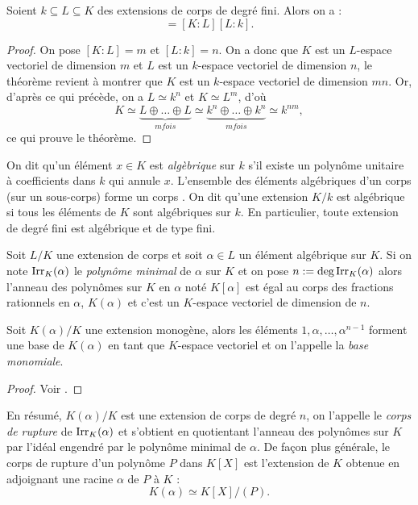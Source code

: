\documentclass[a4paper]{article} %
\numberwithin{section}{part}
\numberwithin{equation}{section}
\newcommand\Irr[2]{\textup{Irr}_{#1}(#2)}
\begin{document}
\begin{thm}
Soient $k \subseteq L \subseteq K$ des extensions de corps de degré fini. Alors 
on a :
\begin{equation}
[K:k] = [K:L][L:k].
\end{equation}
\end{thm}
\begin{proof}
On pose $[K:L] = m$ et $[L:k] = n$. On a donc que $K$ est un $L$-espace 
vectoriel de dimension $m$ et $L$ est un $k$-espace vectoriel de dimension $n$, 
le théorème revient à montrer que $K$ est un $k$-espace vectoriel de dimension 
$mn$. Or, d'après ce qui précède, on a $L \simeq k^n$ et $K \simeq L^m$, d'où
\begin{equation}
K \simeq \underbrace{L \oplus\dots\oplus L}_{m fois}\simeq\underbrace
{k^n\oplus\dots\oplus k^n}_{m fois} \simeq k^{nm},
\end{equation}
ce qui prouve le théorème.
\end{proof}

On dit qu'un élément $x\in K$ est \emph{algèbrique} sur $k$ s'il existe un 
polynôme unitaire à coefficients dans $k$ qui annule $x$. L'ensemble des 
éléments algébriques d'un corps (sur un sous-corps) forme un corps \cite[p.~64, 
théorème 1.14]{Per}. On dit qu'une extension $K/k$ est algébrique si tous les 
éléments de $K$ sont algébriques sur $k$. En particulier, toute extension de
degré fini est algébrique et de type fini.\par
Soit $L/K$ une extension de corps et soit $\alpha\in L$ un élément algébrique 
sur $K$. Si on note $\Irr{K}{\alpha}$ le \emph{polynôme minimal} de $\alpha$ sur
$K$ et on pose $n := \textup{deg\,}\Irr{K}{\alpha}$ alors l'anneau des polynômes
sur $K$ en $\alpha$ noté $K[\alpha]$ est égal au corps des fractions rationnels
en $\alpha$, $K(\alpha)$ et c'est un $K$-espace vectoriel de dimension de $n$.
\begin{defnp}
Soit $K(\alpha)/K$ une extension monogène, alors les éléments 
$1,\alpha,\dots,\alpha^{n-1}$ forment une base de $K(\alpha)$ en tant que
$K$-espace vectoriel et on l'appelle la \emph{base monomiale}.
\end{defnp}
\begin{proof}
Voir \cite[III, th. 1.11]{Per}.
\end{proof}

En résumé, $K(\alpha)/K$ est une extension de corps de
degré $n$, on l'appelle le \emph{corps de rupture} de $\Irr{K}{\alpha}$ et
s'obtient en quotientant l'anneau des polynômes sur $K$ par l'idéal engendré par
le polynôme minimal de $\alpha$. De façon plus générale, le corps de rupture 
d'un polynôme $P$ dans $K[X]$ est l'extension de $K$ obtenue en adjoignant une 
racine $\alpha$ de $P$ à $K$ :
\begin{equation}
K(\alpha)\simeq K[X]/(P).
\end{equation}
\end{document}
